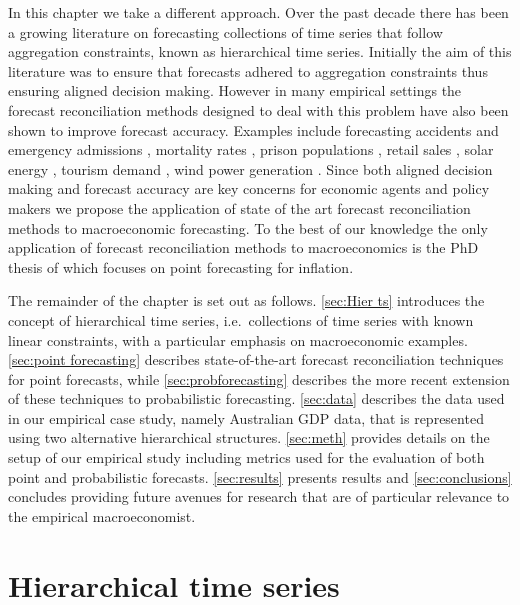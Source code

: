\documentclass[graybox]{svmult}
\begin{document}
In this chapter we take a different approach. Over the past decade there has been a growing literature on forecasting collections of time series that follow aggregation constraints, known as hierarchical time series. Initially the aim of this literature was to ensure that forecasts adhered to aggregation constraints thus ensuring aligned decision making. However in many empirical settings the forecast reconciliation methods designed to deal with this problem have also been shown to improve forecast accuracy. Examples include forecasting accidents and emergency admissions \citep{AthEtAl2017}, mortality rates \citep{ShaHyn2017}, prison populations \citep{AthEtAl2019}, retail sales \citep{VilPed2018}, solar energy \citep{YanEtAl2017,YagEtAl2019}, tourism demand \citep{AthEtAl2009, HynEtAl2011, WicEtAl2019}, wind power generation \citep{ZhaDon2018}. Since both aligned decision making and forecast accuracy are key concerns for economic agents and policy makers we propose the application of state of the art forecast reconciliation methods to macroeconomic forecasting. To the best of our knowledge the only application of forecast reconciliation methods to macroeconomics is the PhD thesis of \citep{weiss2018essays} which focuses on point forecasting for inflation.


The remainder of the chapter is set out as follows. \autoref{sec:Hier ts} introduces the concept of hierarchical time series, i.e.\ collections of time series with known linear constraints, with a particular emphasis on macroeconomic examples. \autoref{sec:point forecasting} describes state-of-the-art forecast reconciliation techniques for point forecasts, while \autoref{sec:probforecasting} describes the more recent extension of these techniques to probabilistic forecasting. \autoref{sec:data} describes the data used in our empirical case study, namely Australian GDP data, that is represented using two alternative hierarchical structures. \autoref{sec:meth} provides details on the setup of our empirical study including metrics used for the evaluation of both point and probabilistic forecasts. \autoref{sec:results} presents results and \autoref{sec:conclusions} concludes providing future avenues for research that are of particular relevance to the empirical macroeconomist.

\section{Hierarchical time series}\label{sec:Hier ts}
\end{document}
